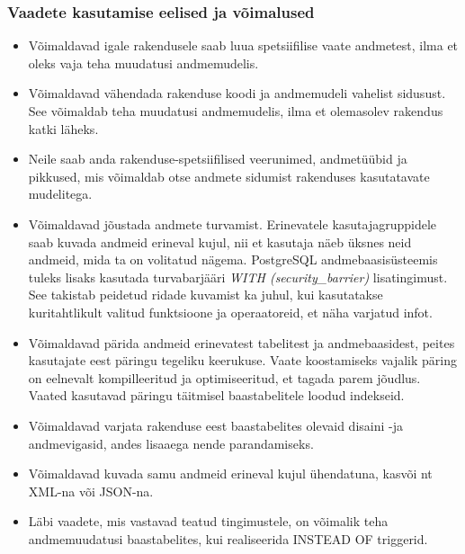 \documentclass[a4paper,12pt]{article} %
\begin{document}
\subsubsection{Vaadete kasutamise eelised ja võimalused}
\begin{itemize}
\item Võimaldavad igale rakendusele saab luua spetsiifilise vaate andmetest, ilma et oleks vaja teha muudatusi andmemudelis.
\item Võimaldavad vähendada rakenduse koodi ja andmemudeli vahelist sidusust.
See võimaldab teha muudatusi andmemudelis, ilma et olemasolev rakendus katki läheks.
\item Neile saab anda rakenduse-spetsiifilised veerunimed, andmetüübid ja pikkused, mis võimaldab otse andmete sidumist rakenduses kasutatavate mudelitega.
\item Võimaldavad jõustada andmete turvamist. Erinevatele kasutajagruppidele saab kuvada andmeid erineval kujul, nii et kasutaja näeb üksnes neid andmeid, mida ta on volitatud nägema. PostgreSQL andmebaasisüsteemis tuleks lisaks kasutada turvabarjääri \textit{WITH (security\_barrier)} lisatingimust. See takistab peidetud ridade kuvamist ka juhul, kui kasutatakse kuritahtlikult valitud funktsioone ja operaatoreid, et näha varjatud infot. \cite{PostgreSQLRulesAndPrivileges}
\item Võimaldavad pärida andmeid erinevatest tabelitest ja andmebaasidest, peites kasutajate eest päringu tegeliku keerukuse. Vaate koostamiseks vajalik päring on eelnevalt kompilleeritud ja optimiseeritud, et tagada parem jõudlus. Vaated kasutavad päringu täitmisel baastabelitele loodud indekseid.
\item Võimaldavad varjata rakenduse eest baastabelites olevaid disaini -ja andmevigasid, andes lisaaega nende parandamiseks.
\item Võimaldavad kuvada samu andmeid erineval kujul ühendatuna, kasvõi nt XML-na või JSON-na.
\item Läbi vaadete, mis vastavad teatud tingimustele, on võimalik teha andmemuudatusi baastabelites, kui realiseerida INSTEAD OF triggerid.
\end{itemize}
\cite[lk 172-173]{BuildingTheAgileDatabase}
\end{document}
